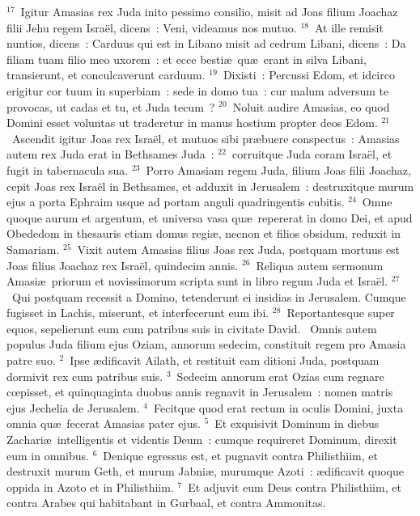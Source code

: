 ${}^{17}$~Igitur Amasias rex Juda inito pessimo consilio, misit ad Joas filium Joachaz filii Jehu regem Isra\"el, dicens~: Veni, videamus nos mutuo.
${}^{18}$~At ille remisit nuntios, dicens~: Carduus qui est in Libano misit ad cedrum Libani, dicens~: Da filiam tuam filio meo uxorem~: et ecce besti\ae\ qu\ae\ erant in silva Libani, transierunt, et conculcaverunt carduum.
${}^{19}$~Dixisti~: Percussi Edom, et idcirco erigitur cor tuum in superbiam~: sede in domo tua~: cur malum adversum te provocas, ut cadas et tu, et Juda tecum~?
${}^{20}$~Noluit audire Amasias, eo quod Domini esset voluntas ut traderetur in manus hostium propter deos Edom.
${}^{21}$~Ascendit igitur Joas rex Isra\"el, et mutuos sibi pr\ae buere conspectus~: Amasias autem rex Juda erat in Bethsames Juda~:
${}^{22}$~corruitque Juda coram Isra\"el, et fugit in tabernacula sua.
${}^{23}$~Porro Amasiam regem Juda, filium Joas filii Joachaz, cepit Joas rex Isra\"el in Bethsames, et adduxit in Jerusalem~: destruxitque murum ejus a porta Ephraim usque ad portam anguli quadringentis cubitis.
${}^{24}$~Omne quoque aurum et argentum, et universa vasa qu\ae\ repererat in domo Dei, et apud Obededom in thesauris etiam domus regi\ae , necnon et filios obsidum, reduxit in Samariam.
${}^{25}$~Vixit autem Amasias filius Joas rex Juda, postquam mortuus est Joas filius Joachaz rex Isra\"el, quindecim annis.
${}^{26}$~Reliqua autem sermonum Amasi\ae\ priorum et novissimorum scripta sunt in libro regum Juda et Isra\"el.
${}^{27}$~Qui postquam recessit a Domino, tetenderunt ei insidias in Jerusalem. Cumque fugisset in Lachis, miserunt, et interfecerunt eum ibi.
${}^{28}$~Reportantesque super equos, sepelierunt eum cum patribus suis in civitate David.
~Omnis autem populus Juda filium ejus Oziam, annorum sedecim, constituit regem pro Amasia patre suo.
${}^{2}$~Ipse \ae dificavit Ailath, et restituit eam ditioni Juda, postquam dormivit rex cum patribus suis.
${}^{3}$~Sedecim annorum erat Ozias cum regnare cœpisset, et quinquaginta duobus annis regnavit in Jerusalem~: nomen matris ejus Jechelia de Jerusalem.
${}^{4}$~Fecitque quod erat rectum in oculis Domini, juxta omnia qu\ae\ fecerat Amasias pater ejus.
${}^{5}$~Et exquisivit Dominum in diebus Zachari\ae\ intelligentis et videntis Deum~: cumque requireret Dominum, direxit eum in omnibus.
${}^{6}$~Denique egressus est, et pugnavit contra Philisthiim, et destruxit murum Geth, et murum Jabni\ae , murumque Azoti~: \ae dificavit quoque oppida in Azoto et in Philisthiim.
${}^{7}$~Et adjuvit eum Deus contra Philisthiim, et contra Arabes qui habitabant in Gurbaal, et contra Ammonitas.
